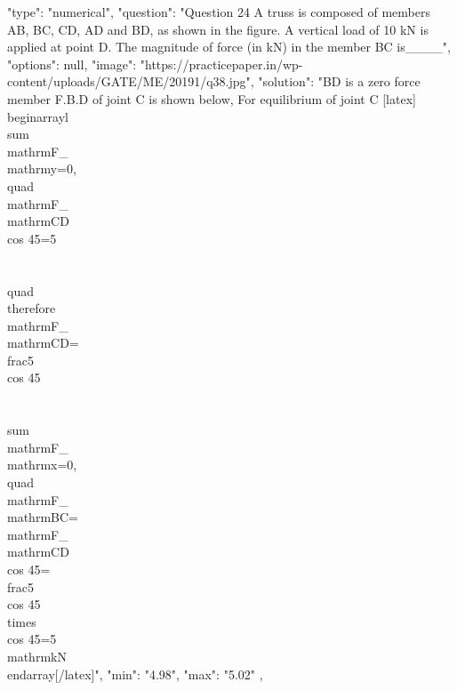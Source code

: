   {
    "type": "numerical",
    "question": "Question 24 A truss is composed of members AB, BC, CD, AD and BD, as shown in the figure. A vertical load of 10 kN is applied at point D. The magnitude of force (in kN) in the member BC is____",
    "options": null,
    "image": "https://practicepaper.in/wp-content/uploads/GATE/ME/20191/q38.jpg",
    "solution": "BD is a zero force member F.B.D of joint C is shown below, For equilibrium of joint C [latex] \\begin{array}{l} \\sum \\mathrm{F}_{\\mathrm{y}}=0, \\quad \\mathrm{F}_{\\mathrm{CD}} \\cos 45=5 \\\\ \\quad \\therefore \\mathrm{F}_{\\mathrm{CD}}=\\frac{5}{\\cos 45} \\\\ \\sum \\mathrm{F}_{\\mathrm{x}=0}, \\quad \\mathrm{F}_{\\mathrm{BC}}=\\mathrm{F}_{\\mathrm{CD}} \\cos 45=\\frac{5}{\\cos 45} \\times \\cos 45=5 \\mathrm{kN} \\end{array}[/latex]",
    "min": "4.98",
    "max": "5.02"
  },
